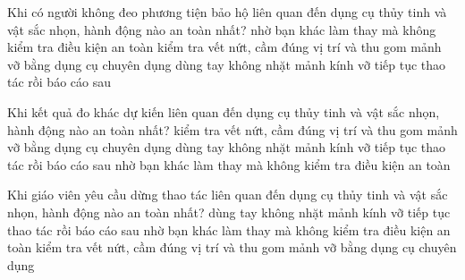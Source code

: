 \begin{ex}
Khi có người không đeo phương tiện bảo hộ liên quan đến dụng cụ thủy tinh và vật sắc nhọn, hành động nào an toàn nhất?
\choice
{nhờ bạn khác làm thay mà không kiểm tra điều kiện an toàn}
{\True kiểm tra vết nứt, cầm đúng vị trí và thu gom mảnh vỡ bằng dụng cụ chuyên dụng}
{dùng tay không nhặt mảnh kính vỡ}
{tiếp tục thao tác rồi báo cáo sau}
\end{ex}

\begin{ex}
Khi kết quả đo khác dự kiến liên quan đến dụng cụ thủy tinh và vật sắc nhọn, hành động nào an toàn nhất?
\choice
{\True kiểm tra vết nứt, cầm đúng vị trí và thu gom mảnh vỡ bằng dụng cụ chuyên dụng}
{dùng tay không nhặt mảnh kính vỡ}
{tiếp tục thao tác rồi báo cáo sau}
{nhờ bạn khác làm thay mà không kiểm tra điều kiện an toàn}
\end{ex}

\begin{ex}
Khi giáo viên yêu cầu dừng thao tác liên quan đến dụng cụ thủy tinh và vật sắc nhọn, hành động nào an toàn nhất?
\choice
{dùng tay không nhặt mảnh kính vỡ}
{tiếp tục thao tác rồi báo cáo sau}
{nhờ bạn khác làm thay mà không kiểm tra điều kiện an toàn}
{\True kiểm tra vết nứt, cầm đúng vị trí và thu gom mảnh vỡ bằng dụng cụ chuyên dụng}
\end{ex}

